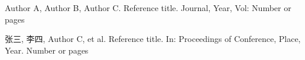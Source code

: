 \documentclass{SCIS2020cn}
\begin{document}


\begin{thebibliography}{99}

     Author A, Author B, Author C. Reference title. Journal, Year, Vol: Number or pages

     张三, 李四, Author C, et al. Reference title. In: Proceedings of Conference, Place, Year. Number or pages

\end{thebibliography}



\makeentitle




\end{document}
